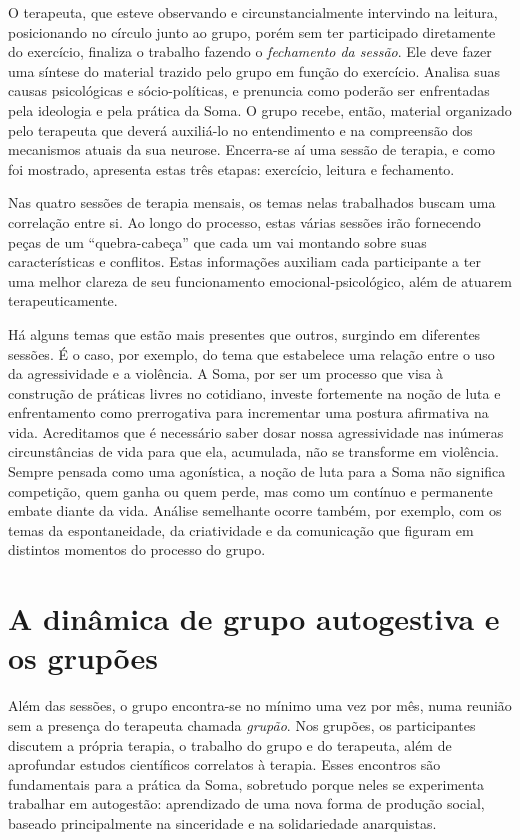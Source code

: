 O terapeuta, que esteve observando e circunstancialmente intervindo na
leitura, posicionando no círculo junto ao grupo, porém sem ter
participado diretamente do exercício, finaliza o trabalho fazendo o
\emph{fechamento da sessão}. Ele deve fazer uma síntese do material
trazido pelo grupo em função do exercício. Analisa suas causas
psicológicas e sócio-políticas, e prenuncia como poderão ser enfrentadas
pela ideologia e pela prática da Soma. O grupo recebe, então, material
organizado pelo terapeuta que deverá auxiliá-lo no entendimento e na
compreensão dos mecanismos atuais da sua neurose. Encerra-se aí uma
sessão de terapia, e como foi mostrado, apresenta estas três etapas:
exercício, leitura e fechamento.

Nas quatro sessões de terapia mensais, os temas nelas trabalhados buscam
uma correlação entre si. Ao longo do processo, estas várias sessões irão
fornecendo peças de um ``quebra-cabeça'' que cada um vai montando sobre
suas características e conflitos. Estas informações auxiliam cada
participante a ter uma melhor clareza de seu funcionamento
emocional-psicológico, além de atuarem terapeuticamente.

Há alguns temas que estão mais presentes que outros, surgindo em
diferentes sessões. É o caso, por exemplo, do tema que estabelece uma
relação entre o uso da agressividade e a violência. A Soma, por ser um
processo que visa à construção de práticas livres no cotidiano, investe
fortemente na noção de luta e enfrentamento como prerrogativa para
incrementar uma postura afirmativa na vida. Acreditamos que é necessário
saber dosar nossa agressividade nas inúmeras circunstâncias de vida para
que ela, acumulada, não se transforme em violência. Sempre pensada como
uma agonística, a noção de luta para a Soma não significa competição,
quem ganha ou quem perde, mas como um contínuo e permanente embate
diante da vida. Análise semelhante ocorre também, por exemplo, com os
temas da espontaneidade, da criatividade e da comunicação que figuram em
distintos momentos do processo do grupo.

\section{A dinâmica de grupo autogestiva e os grupões}

Além das sessões, o grupo encontra-se no mínimo uma vez por mês, numa
reunião sem a presença do terapeuta chamada \emph{grupão}. Nos grupões,
os participantes discutem a própria terapia, o trabalho do grupo e do
terapeuta, além de aprofundar estudos científicos correlatos à terapia.
Esses encontros são fundamentais para a prática da Soma, sobretudo
porque neles se experimenta trabalhar em autogestão: aprendizado de uma
nova forma de produção social, baseado principalmente na sinceridade e
na solidariedade anarquistas.

